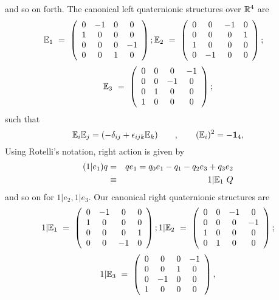 \documentclass[a4paper,12pt]{book}
\begin{document}
and so on forth. The canonical left quaternionic structures \cite{yano}\cite
{kh1} over $\Bbb{R}^{4}$ are 
\[
\Bbb{E}_{1}~=~\left( 
\begin{array}{cccc}
0 & -1 & 0 & 0 \\ 
1 & 0 & 0 & 0 \\ 
0 & 0 & 0 & -1 \\ 
0 & 0 & 1 & 0
\end{array}
\right) ;\Bbb{E}_{2}~=~\left( 
\begin{array}{cccc}
0 & 0 & -1 & 0 \\ 
0 & 0 & 0 & 1 \\ 
1 & 0 & 0 & 0 \\ 
0 & -1 & 0 & 0
\end{array}
\right) ;\quad 
\]
\begin{equation}
\Bbb{E}_{3}~=~\left( 
\begin{array}{cccc}
0 & 0 & 0 & -1 \\ 
0 & 0 & -1 & 0 \\ 
0 & 1 & 0 & 0 \\ 
1 & 0 & 0 & 0
\end{array}
\right) ;  \label{q1}
\end{equation}
such that 
\begin{equation}
\Bbb{E}_{i}\Bbb{E}_{j}=(-\delta _{ij}+\epsilon _{ijk}\Bbb{E}_{k})\qquad
,\qquad (\Bbb{E}_{i})^{2}=-\mathbf{1}_{4},  \label{q2}
\end{equation}
Using Rotelli's notation, right action is given by 
\begin{eqnarray}
(1|e_{1})q &=&qe_{1}=q_{0}e_{1}-q_{1}-q_{2}e_{3}+q_{3}e_{2} \\
&\equiv &1|\Bbb{E}_{1}~Q
\end{eqnarray}
and so on for $1|e_{2},1|e_{3}$. Our canonical right quaternionic structures
are 
\[
{1|}\Bbb{E}_{1}~=~\left( 
\begin{array}{cccc}
0 & -1 & 0 & 0 \\ 
1 & 0 & 0 & 0 \\ 
0 & 0 & 0 & 1 \\ 
0 & 0 & -1 & 0
\end{array}
\right) ;{1|}\Bbb{E}_{2}~=~\left( 
\begin{array}{cccc}
0 & 0 & -1 & 0 \\ 
0 & 0 & 0 & -1 \\ 
1 & 0 & 0 & 0 \\ 
0 & 1 & 0 & 0
\end{array}
\right) ; 
\]
\begin{equation}
{1|}\Bbb{E}_{3}~=~\left( 
\begin{array}{cccc}
0 & 0 & 0 & -1 \\ 
0 & 0 & 1 & 0 \\ 
0 & -1 & 0 & 0 \\ 
1 & 0 & 0 & 0
\end{array}
\right) ,  \label{q3}
\end{equation}
\end{document}
